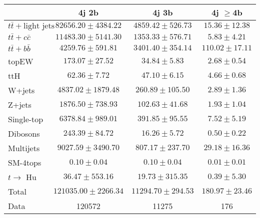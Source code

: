 \begin{table}
\begin{center}
  \begin{tabular}{ | l |  c |  c |  c | }
    \hline \hline 
     & 4j 2b  & 4j 3b  & 4j $\geq$4b  \\ 
    \hline 
     $t\bar{t}+\text{light jets}$  &   $ 82656.20 \pm 4384.22 $ &   $ 4859.42 \pm 526.73 $ &   $ 15.36 \pm 12.38 $ \\ 
     $t\bar{t}+c\bar{c}$  &   $ 11483.30 \pm 5141.30 $ &   $ 1353.33 \pm 576.71 $ &   $ 5.83 \pm 4.21 $ \\ 
     $t\bar{t}+b\bar{b}$  &   $ 4259.76 \pm 591.81 $ &   $ 3401.40 \pm 354.14 $ &   $ 110.02 \pm 17.11 $ \\ 
    topEW  &   $ 173.07 \pm 27.52 $ &   $ 34.84 \pm 5.83 $ &   $ 2.68 \pm 0.54 $ \\ 
    ttH  &   $ 62.36 \pm 7.72 $ &   $ 47.10 \pm 6.15 $ &   $ 4.66 \pm 0.68 $ \\ 
    W+jets  &   $ 4837.02 \pm 1879.48 $ &   $ 260.89 \pm 105.50 $ &   $ 2.89 \pm 1.36 $ \\ 
    Z+jets  &   $ 1876.50 \pm 738.93 $ &   $ 102.63 \pm 41.68 $ &   $ 1.93 \pm 1.04 $ \\ 
    Single-top  &   $ 6378.84 \pm 989.01 $ &   $ 391.85 \pm 95.55 $ &   $ 7.52 \pm 5.19 $ \\ 
    Dibosons  &   $ 243.39 \pm 84.72 $ &   $ 16.26 \pm 5.72 $ &   $ 0.50 \pm 0.22 $ \\ 
    Multijets  &   $ 9027.59 \pm 3490.70 $ &   $ 807.17 \pm 237.70 $ &   $ 29.18 \pm 16.36 $ \\ 
    SM-4tops  &   $ 0.10 \pm 0.04 $ &   $ 0.10 \pm 0.04 $ &   $ 0.01 \pm 0.01 $ \\ 
     $t\rightarrow$ Hu  &   $ 36.47 \pm 553.16 $ &   $ 19.73 \pm 315.35 $ &   $ 0.39 \pm 5.30 $ \\ 
    Total  &   $ 121035.00 \pm 2266.34 $ &   $ 11294.70 \pm 294.53 $ &   $ 180.97 \pm 23.46 $ \\ 
    \hline 
    Data  & 120572  & 11275  & 176  \\ 
    \hline \hline 
  \end{tabular} 



\end{center}
\end{table}
